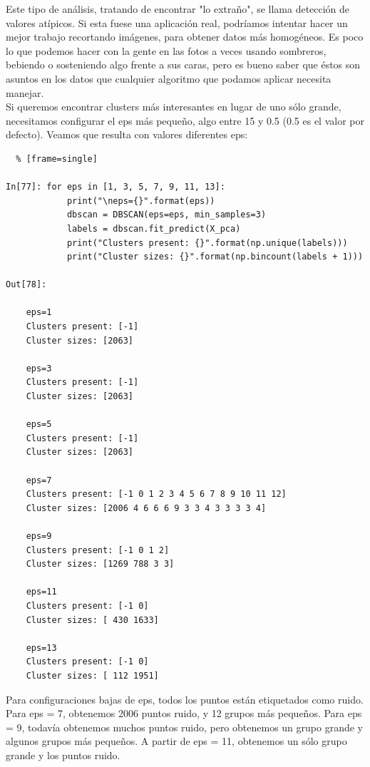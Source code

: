 Este tipo de análisis, tratando de encontrar "{}lo extraño"{}, se llama detección de valores atípicos. Si
esta fuese una aplicación real, podríamos intentar hacer un mejor trabajo recortando imágenes, para obtener
datos más homogéneos. Es poco lo que podemos hacer con la gente en las fotos a veces usando sombreros, bebiendo o sosteniendo algo frente a sus caras, pero es bueno saber que éstos son asuntos en los datos que cualquier algoritmo que podamos aplicar necesita manejar.\\

Si queremos encontrar clusters más interesantes en lugar de uno sólo grande, necesitamos configurar el {\ttfamily eps}  más pequeño, algo entre  15 y 0.5 (0.5 es el  valor por defecto).  Veamos  que resulta con  valores diferentes {\ttfamily eps}:


\begin{lstlisting}  % [frame=single]	

In[77]: for eps in [1, 3, 5, 7, 9, 11, 13]:
            print("\neps={}".format(eps))
            dbscan = DBSCAN(eps=eps, min_samples=3)
            labels = dbscan.fit_predict(X_pca)
            print("Clusters present: {}".format(np.unique(labels)))
            print("Cluster sizes: {}".format(np.bincount(labels + 1)))

Out[78]:

    eps=1
    Clusters present: [-1]
    Cluster sizes: [2063]
    
    eps=3
    Clusters present: [-1]
    Cluster sizes: [2063]

    eps=5
    Clusters present: [-1]
    Cluster sizes: [2063]
    
    eps=7
    Clusters present: [-1 0 1 2 3 4 5 6 7 8 9 10 11 12]
    Cluster sizes: [2006 4 6 6 6 9 3 3 4 3 3 3 3 4]
    
    eps=9
    Clusters present: [-1 0 1 2]
    Cluster sizes: [1269 788 3 3]
    
    eps=11
    Clusters present: [-1 0]
    Cluster sizes: [ 430 1633]
    
    eps=13
    Clusters present: [-1 0]
    Cluster sizes: [ 112 1951]

\end{lstlisting} 


Para configuraciones bajas de {\ttfamily eps}, todos los puntos están etiquetados como ruido. 
Para {\ttfamily eps} = 7, obtenemos  2006  puntos ruido,  y 12  grupos más pequeños. Para {\ttfamily eps} = 9,  todavía  obtenemos muchos puntos ruido, pero obtenemos un grupo grande y algunos grupos más pequeños. A partir de {\ttfamily eps} = 11, obtenemos un  sólo grupo  grande y los puntos ruido.\\


